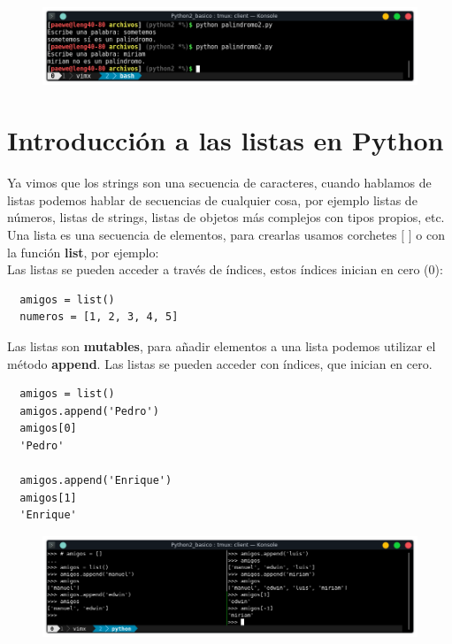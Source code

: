 \documentclass{article}
\begin{document}
\begin{figure}[h!]
  \centering
  \includegraphics[scale=0.75]{./Pictures/032_palindromo.png}
\end{figure}




\section{Introducción a las listas en Python}%
Ya vimos que los strings son una secuencia de caracteres, cuando hablamos de
listas podemos hablar de secuencias de cualquier cosa, por ejemplo listas de
números, listas de strings, listas de objetos más complejos con tipos propios,
etc.\\

Una lista es una secuencia de elementos, para crearlas usamos corchetes $[$ $]$
o con la función \textbf{list}, por ejemplo:\\

Las listas se pueden acceder a través de índices, estos índices inician en cero
(0):

\begin{verbatim}
  amigos = list()
  numeros = [1, 2, 3, 4, 5]
\end{verbatim}

Las listas son \textbf{mutables}, para añadir elementos a una lista podemos
utilizar el método \textbf{append}. Las listas se pueden acceder con índices,
que inician en cero.

\begin{verbatim}
  amigos = list()
  amigos.append('Pedro')
  amigos[0]
  'Pedro'

  amigos.append('Enrique')
  amigos[1]
  'Enrique'
\end{verbatim}

\begin{figure}[h!]
  \centering
  \includegraphics[scale=0.75]{./Pictures/033_listas.png}
\end{figure}
\end{document}
